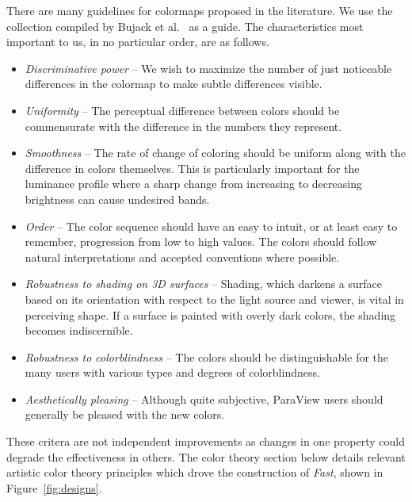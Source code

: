 \documentclass{IEEEcsmag}
\newcommand*{\colormap}[1]{\textsl{#1}\xspace}
\newcommand*{\fast}{\colormap{Fast}}
\begin{document}
There are many guidelines for colormaps proposed in the literature. We use the collection compiled by Bujack et al.~\cite{Bujack2018} as a guide. The characteristics most important to us, in no particular order, are as follows.

\begin{itemize}

\item \emph{Discriminative power} --
  We wish to maximize the number of just noticeable differences in the colormap to make subtle differences visible.
\item \emph{Uniformity} --
  The perceptual difference between colors should be commensurate with the difference in the numbers they represent.
\item \emph{Smoothness} --
  The rate of change of coloring should be uniform along with the difference in colors themselves.
  This is particularly important for the luminance profile where a sharp change from increasing to decreasing brightness can cause undesired bands.
\item \emph{Order} --
  The color sequence should have an easy to intuit, or at least easy to remember, progression from low to high values.
  The colors should follow natural interpretations and accepted conventions where possible.
\item \emph{Robustness to shading on 3D surfaces} -- Shading, which darkens a surface based on its orientation with respect to the light source and viewer, is vital in perceiving shape.
  If a surface is painted with overly dark colors, the shading becomes indiscernible.
\item \emph{Robustness to colorblindness} --
  The colors should be distinguishable for the many users with various types and degrees of colorblindness.
\item \emph{Aesthetically pleasing} --
  Although quite subjective, ParaView users should generally be pleased with the new colors.

\end{itemize}
These critera are not independent improvements as changes in one property could degrade the effectiveness in others.
The color theory section below details relevant artistic color theory principles which drove the construction of \fast, shown in Figure~\ref{fig:designs}. 

\end{document}
